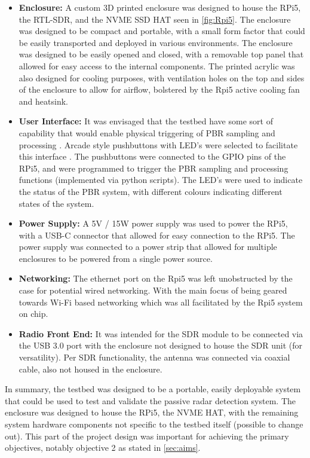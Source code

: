 
\begin{itemize}
    \item \textbf{Enclosure:} A custom 3D printed enclosure was designed to house the RPi5, the RTL-SDR, and the NVME SSD HAT seen in \ref{fig:Rpi5}. The enclosure was designed to be compact and portable, with a small form factor that could be easily transported and deployed in various environments. The enclosure was designed to be easily opened and closed, with a removable top panel that allowed for easy access to the internal components. The printed acrylic was also designed for cooling purposes, with ventilation holes on the top and sides of the enclosure to allow for airflow, bolstered by the Rpi5 active cooling fan and heatsink.
    \item \textbf{User Interface:} It was envisaged that the testbed have some sort of capability that would enable physical triggering of PBR sampling and processing . Arcade style pushbuttons with LED's were selected to facilitate this interface \cite{pushbuttons}. The pushbuttons were connected to the GPIO pins of the RPi5, and were programmed to trigger the PBR sampling and processing functions (implemented via python scripts). The LED's were used to indicate the status of the PBR system, with different colours indicating different states of the system.
    \item \textbf{Power Supply:} A 5V / 15W power supply was used to power the RPi5, with a USB-C connector that allowed for easy connection to the RPi5. The power supply was connected to a power strip that allowed for multiple enclosures to be powered from a single power source.
    \item \textbf{Networking:} The ethernet port on the Rpi5 was left unobstructed by the case for potential wired networking. With the main focus of being geared towards Wi-Fi based networking which was all facilitated by the Rpi5 system on chip.
    \item \textbf{Radio Front End:} It was intended for the SDR module to be connected via the USB 3.0 port with the enclosure not designed to house the SDR unit (for versatility). Per SDR functionality, the antenna was connected via coaxial cable, also not housed in the enclosure. 
    
\end{itemize}

In summary, the testbed was designed to be a portable, easily deployable system that could be used to test and validate the passive radar detection system. The enclosure was designed to house the RPi5, the NVME HAT, with the remaining system hardware components not specific to the testbed itself (possible to change out). This part of the project design was important for achieving the primary objectives, notably objective 2 as stated in \ref{sec:aims}.

